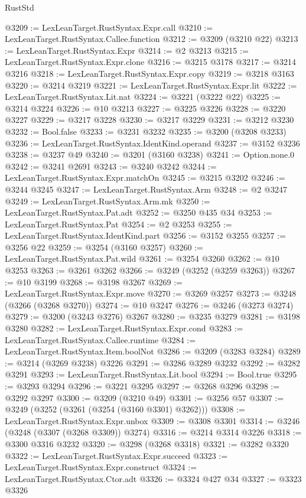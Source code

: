 \begin{lexlean}{RustStd}
\begin{coremodule}
@3209 := LexLeanTarget.RustSyntax.Expr.call
@3210 := LexLeanTarget.RustSyntax.Callee.function
@3212 := @3209 (@3210 @22)
@3213 := LexLeanTarget.RustSyntax.Expr
@3214 := @2 @3213
@3215 := LexLeanTarget.RustSyntax.Expr.clone
@3216 := @3215 @3178
@3217 := @3214 @3216
@3218 := LexLeanTarget.RustSyntax.Expr.copy
@3219 := @3218 @3163
@3220 := @3214 @3219
@3221 := LexLeanTarget.RustSyntax.Expr.lit
@3222 := LexLeanTarget.RustSyntax.Lit.nat
@3224 := @3221 (@3222 @22)
@3225 := @3214 @3224
@3226 := @10 @3213
@3227 := @3225 @3226
@3228 := @3220 @3227
@3229 := @3217 @3228
@3230 := @3217 @3229
@3231 := @3212 @3230
@3232 := Bool.false
@3233 := @3231 @3232
@3235 := @3200 (@3208 @3233)
@3236 := LexLeanTarget.RustSyntax.IdentKind.operand
@3237 := @3152 @3236
@3238 := @3237 @49
@3240 := @3201 (@3160 @3238)
@3241 := Option.none.{0}
@3242 := @3241 @2691
@3243 := @3240 @3242
@3244 := LexLeanTarget.RustSyntax.Expr.matchOn
@3245 := @3215 @3202
@3246 := @3244 @3245
@3247 := LexLeanTarget.RustSyntax.Arm
@3248 := @2 @3247
@3249 := LexLeanTarget.RustSyntax.Arm.mk
@3250 := LexLeanTarget.RustSyntax.Pat.adt
@3252 := @3250 @435 @34
@3253 := LexLeanTarget.RustSyntax.Pat
@3254 := @2 @3253
@3255 := LexLeanTarget.RustSyntax.IdentKind.part
@3256 := @3152 @3255
@3257 := @3256 @22
@3259 := @3254 (@3160 @3257)
@3260 := LexLeanTarget.RustSyntax.Pat.wild
@3261 := @3254 @3260
@3262 := @10 @3253
@3263 := @3261 @3262
@3266 := @3249 (@3252 (@3259 @3263))
@3267 := @10 @3199
@3268 := @3198 @3267
@3269 := LexLeanTarget.RustSyntax.Expr.move
@3270 := @3269 @3257
@3273 := @3248 (@3266 (@3268 @3270))
@3274 := @10 @3247
@3276 := @3246 (@3273 @3274)
@3279 := @3200 (@3243 @3276) @3267
@3280 := @3235 @3279
@3281 := @3198 @3280
@3282 := LexLeanTarget.RustSyntax.Expr.cond
@3283 := LexLeanTarget.RustSyntax.Callee.runtime
@3284 := LexLeanTarget.RustSyntax.Item.boolNot
@3286 := @3209 (@3283 @3284)
@3289 := @3214 (@3269 @3238) @3226
@3291 := @3286 @3289 @3232
@3292 := @3282 @3291
@3293 := LexLeanTarget.RustSyntax.Lit.bool
@3294 := Bool.true
@3295 := @3293 @3294
@3296 := @3221 @3295
@3297 := @3268 @3296
@3298 := @3292 @3297
@3300 := @3209 (@3210 @49)
@3301 := @3256 @57
@3307 := @3249 (@3252 (@3261 (@3254 (@3160 @3301) @3262)))
@3308 := LexLeanTarget.RustSyntax.Expr.unbox
@3309 := @3308 @3301
@3314 := @3246 (@3248 (@3307 (@3268 @3309)) @3274)
@3316 := @3214 @3314 @3226
@3318 := @3300 @3316 @3232
@3320 := @3298 (@3268 @3318)
@3321 := @3282 @3320
@3322 := LexLeanTarget.RustSyntax.Expr.succeed
@3323 := LexLeanTarget.RustSyntax.Expr.construct
@3324 := LexLeanTarget.RustSyntax.Ctor.adt
@3326 := @3324 @427 @34
@3327 := @3323 @3326

\end{coremodule}
\end{lexlean}
